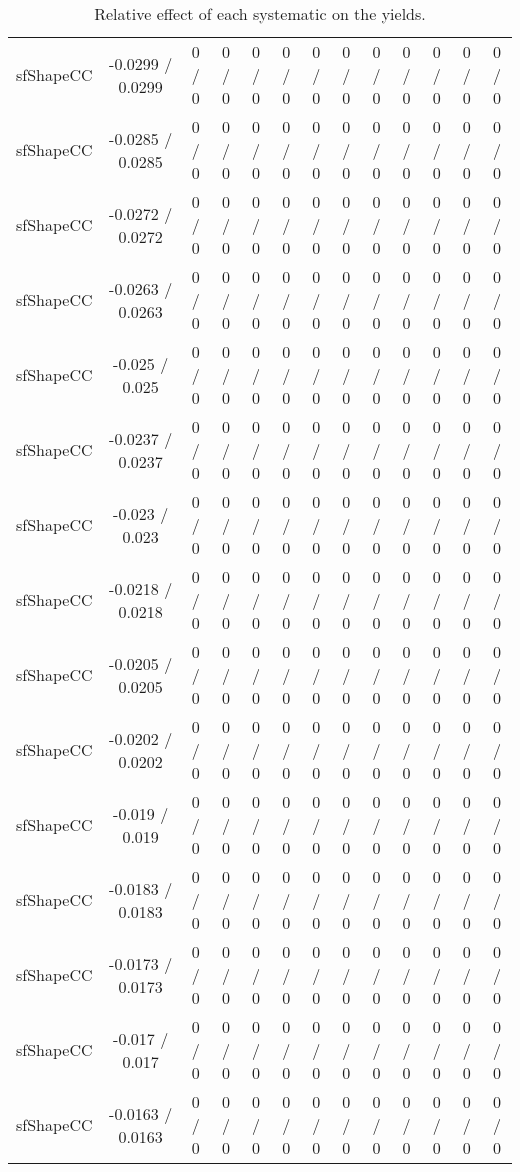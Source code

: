 \documentclass[10pt]{article}
\begin{document}
\begin{table}[htbp]
\begin{center}
\begin{tabular}{|c|c|c|c|c|c|c|c|c|c|c|c|c|}
  sfShapeCC & -0.0299 / 0.0299 & 0 / 0 & 0 / 0 & 0 / 0 & 0 / 0 & 0 / 0 & 0 / 0 & 0 / 0 & 0 / 0 & 0 / 0 & 0 / 0 & 0 / 0 \\ 
  sfShapeCC & -0.0285 / 0.0285 & 0 / 0 & 0 / 0 & 0 / 0 & 0 / 0 & 0 / 0 & 0 / 0 & 0 / 0 & 0 / 0 & 0 / 0 & 0 / 0 & 0 / 0 \\ 
  sfShapeCC & -0.0272 / 0.0272 & 0 / 0 & 0 / 0 & 0 / 0 & 0 / 0 & 0 / 0 & 0 / 0 & 0 / 0 & 0 / 0 & 0 / 0 & 0 / 0 & 0 / 0 \\ 
  sfShapeCC & -0.0263 / 0.0263 & 0 / 0 & 0 / 0 & 0 / 0 & 0 / 0 & 0 / 0 & 0 / 0 & 0 / 0 & 0 / 0 & 0 / 0 & 0 / 0 & 0 / 0 \\ 
  sfShapeCC & -0.025 / 0.025 & 0 / 0 & 0 / 0 & 0 / 0 & 0 / 0 & 0 / 0 & 0 / 0 & 0 / 0 & 0 / 0 & 0 / 0 & 0 / 0 & 0 / 0 \\ 
  sfShapeCC & -0.0237 / 0.0237 & 0 / 0 & 0 / 0 & 0 / 0 & 0 / 0 & 0 / 0 & 0 / 0 & 0 / 0 & 0 / 0 & 0 / 0 & 0 / 0 & 0 / 0 \\ 
  sfShapeCC & -0.023 / 0.023 & 0 / 0 & 0 / 0 & 0 / 0 & 0 / 0 & 0 / 0 & 0 / 0 & 0 / 0 & 0 / 0 & 0 / 0 & 0 / 0 & 0 / 0 \\ 
  sfShapeCC & -0.0218 / 0.0218 & 0 / 0 & 0 / 0 & 0 / 0 & 0 / 0 & 0 / 0 & 0 / 0 & 0 / 0 & 0 / 0 & 0 / 0 & 0 / 0 & 0 / 0 \\ 
  sfShapeCC & -0.0205 / 0.0205 & 0 / 0 & 0 / 0 & 0 / 0 & 0 / 0 & 0 / 0 & 0 / 0 & 0 / 0 & 0 / 0 & 0 / 0 & 0 / 0 & 0 / 0 \\ 
  sfShapeCC & -0.0202 / 0.0202 & 0 / 0 & 0 / 0 & 0 / 0 & 0 / 0 & 0 / 0 & 0 / 0 & 0 / 0 & 0 / 0 & 0 / 0 & 0 / 0 & 0 / 0 \\ 
  sfShapeCC & -0.019 / 0.019 & 0 / 0 & 0 / 0 & 0 / 0 & 0 / 0 & 0 / 0 & 0 / 0 & 0 / 0 & 0 / 0 & 0 / 0 & 0 / 0 & 0 / 0 \\ 
  sfShapeCC & -0.0183 / 0.0183 & 0 / 0 & 0 / 0 & 0 / 0 & 0 / 0 & 0 / 0 & 0 / 0 & 0 / 0 & 0 / 0 & 0 / 0 & 0 / 0 & 0 / 0 \\ 
  sfShapeCC & -0.0173 / 0.0173 & 0 / 0 & 0 / 0 & 0 / 0 & 0 / 0 & 0 / 0 & 0 / 0 & 0 / 0 & 0 / 0 & 0 / 0 & 0 / 0 & 0 / 0 \\ 
  sfShapeCC & -0.017 / 0.017 & 0 / 0 & 0 / 0 & 0 / 0 & 0 / 0 & 0 / 0 & 0 / 0 & 0 / 0 & 0 / 0 & 0 / 0 & 0 / 0 & 0 / 0 \\ 
  sfShapeCC & -0.0163 / 0.0163 & 0 / 0 & 0 / 0 & 0 / 0 & 0 / 0 & 0 / 0 & 0 / 0 & 0 / 0 & 0 / 0 & 0 / 0 & 0 / 0 & 0 / 0 \\ 
\hline 
\end{tabular} 
\caption{Relative effect of each systematic on the yields.} 
\end{center} 
\end{table} 
\end{document}
